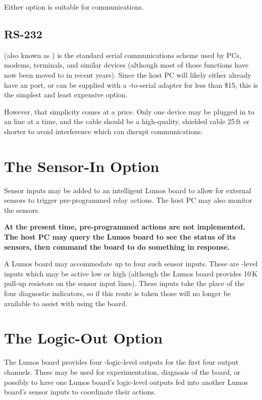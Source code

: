 \documentclass[letterpaper,twoside,onecolumn,openright,final]{memoir}
\begin{document}
Either  option is suitable for  communications.

\subsection{RS-232}
 (also known as ) is the standard serial communications scheme used by
PCs, modems, terminals, and similar devices (although most of those functions have now been moved
to  in recent years).  Since the host PC will likely either already have an 
port, or can be supplied with a -to-serial adapter for less than \$15, this is the
simplest and least expensive option.

However, that simplicity comes at a price.  Only one device may be plugged in to an  line
at a time, and the cable should be a high-quality, shielded cable 25\,ft or shorter to avoid
interference which can disrupt communications.

\section{The Sensor-In Option}
Sensor inputs  may be added to an intelligent Lumos board to allow for external
sensors to trigger pre-programmed relay actions.  The host PC may also monitor the
sensors.

{\bfseries At the present time, pre-programmed actions are not implemented.  The host PC
may query the Lumos board to see the status of its sensors, then command the board to do
something in response.}

A Lumos board may accommodate up to four such sensor inputs.  These are -level inputs
which may be active low or high (although the Lumos board provides 10\,K pull-up resistors on the
sensor input lines).  These inputs take the place of the four diagnostic  indicators,
so if this route is taken those will no longer be available to assist with using the board.

\section{The Logic-Out Option}
The Lumos board provides four -logic-level outputs  
for the first four output channels.  These may be used for experimentation, diagnosis of the board,
or possibly to have one Lumos board's logic-level outputs fed into another Lumos board's sensor inputs
to coordinate their actions.
\end{document}
